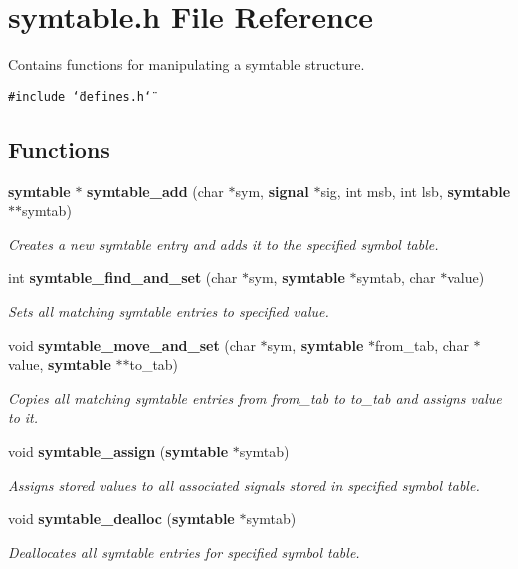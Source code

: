 \section{symtable.h File Reference}
\label{symtable_8h}
Contains functions for manipulating a symtable structure. 


{\tt \#include \char`\"{}defines.h\char`\"{}}\par
\subsection*{Functions}
\begin{CompactItemize}
\item 
{\bf symtable} $\ast$ {\bf symtable\_\-add} (char $\ast$sym, {\bf signal} $\ast$sig, int msb, int lsb, {\bf symtable} $\ast$$\ast$symtab)
\begin{CompactList}\small\item\em Creates a new symtable entry and adds it to the specified symbol table.\item\end{CompactList}\item 
int {\bf symtable\_\-find\_\-and\_\-set} (char $\ast$sym, {\bf symtable} $\ast$symtab, char $\ast$value)
\begin{CompactList}\small\item\em Sets all matching symtable entries to specified value.\item\end{CompactList}\item 
void {\bf symtable\_\-move\_\-and\_\-set} (char $\ast$sym, {\bf symtable} $\ast$from\_\-tab, char $\ast$value, {\bf symtable} $\ast$$\ast$to\_\-tab)
\begin{CompactList}\small\item\em Copies all matching symtable entries from from\_\-tab to to\_\-tab and assigns value to it.\item\end{CompactList}\item 
void {\bf symtable\_\-assign} ({\bf symtable} $\ast$symtab)
\begin{CompactList}\small\item\em Assigns stored values to all associated signals stored in specified symbol table.\item\end{CompactList}\item 
void {\bf symtable\_\-dealloc} ({\bf symtable} $\ast$symtab)
\begin{CompactList}\small\item\em Deallocates all symtable entries for specified symbol table.\item\end{CompactList}\end{CompactItemize}


